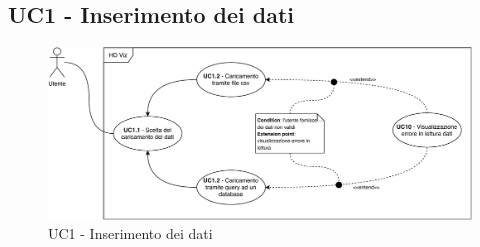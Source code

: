 \subsection{UC1 - Inserimento dei dati }
\label{uc1}

    \begin{figure}[htbp]
        \centering
        \includegraphics[width=1.0\textwidth]{source/sections/casi-uso/diagrams/uc1.pdf}
        \caption{UC1 - Inserimento dei dati}
    \end{figure}
    
